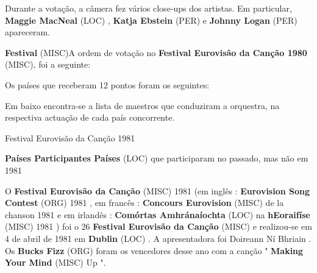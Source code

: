 \documentclass[12pt,a4paper]{article}
\begin{document}
Durante a votação, a câmera fez vários close-ups dos artistas. Em particular, \textbf{Maggie MacNeal} (LOC) , \textbf{Katja Ebstein} (PER) e \textbf{Johnny Logan} (PER) apareceram.



\textbf{Festival} (MISC)A ordem de votação no \textbf{Festival Eurovisão da Canção 1980} (MISC), foi a seguinte:

Os países que receberam 12 pontos foram os seguintes:

Em baixo encontra-se a lista de maestros que conduziram a orquestra, na respectiva actuação de cada país concorrente.



Festival Eurovisão da Canção 1981



\textbf{Países Participantes Países} (LOC) que participaram no passado, mas não em 1981

O \textbf{Festival Eurovisão da Canção} (MISC) 1981 (em inglês : \textbf{Eurovision Song Contest} (ORG) 1981 , em francês : \textbf{Concours Eurovision} (MISC) de la chanson 1981 e em irlandês : \textbf{Comórtas Amhránaíochta} (LOC) na \textbf{hEoraifíse} (MISC) 1981 ) foi o 26 \textbf{Festival Eurovisão da Canção} (MISC) e realizou-se em 4 de abril de 1981 em \textbf{Dublin} (LOC) . A apresentadora foi Doireann Ní Bhriain . Os \textbf{Bucks Fizz} (ORG) foram os vencedores desse ano com a canção " \textbf{Making Your Mind} (MISC) Up ".
\end{document}
